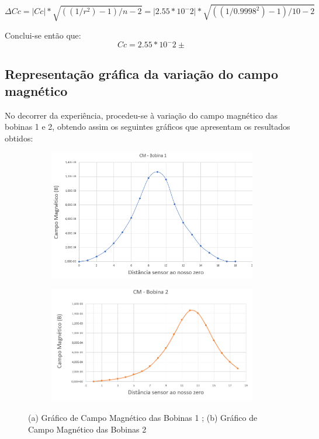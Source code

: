 \begin{equation}
\Delta Cc =|Cc|*\sqrt{((1/r^2)-1)/n-2} = |2.55*10^-2|*\sqrt{((1/0.9998^2)-1)/10-2}
\end{equation}

Conclui-se então que: 
\begin{equation}
Cc= 2.55*10^-2 \pm 
\end{equation}


\subsection*{Representação gráfica da variação do campo magnético}
No decorrer da experiência, procedeu-se à variação do campo magnético das bobinas 1 e 2, obtendo assim os seguintes gráficos que apresentam os resultados obtidos:

\begin{figure}[H]
		\centering
		\begin{subfigure}[t]{0.45\textwidth}
			\centering
			\includegraphics[scale=0.3]{./bobina1.png}
			\caption{}
		\end{subfigure}
		\begin{subfigure}[t]{0.45\textwidth}
			\centering
			{\includegraphics[scale=0.3]{./bobina2.png}}
			\caption{}
			\end{subfigure}	
		\caption{(a) Gráfico de Campo Magnético das Bobinas 1 ; (b) Gráfico de Campo Magnético das Bobinas 2 }
	\end{figure}

